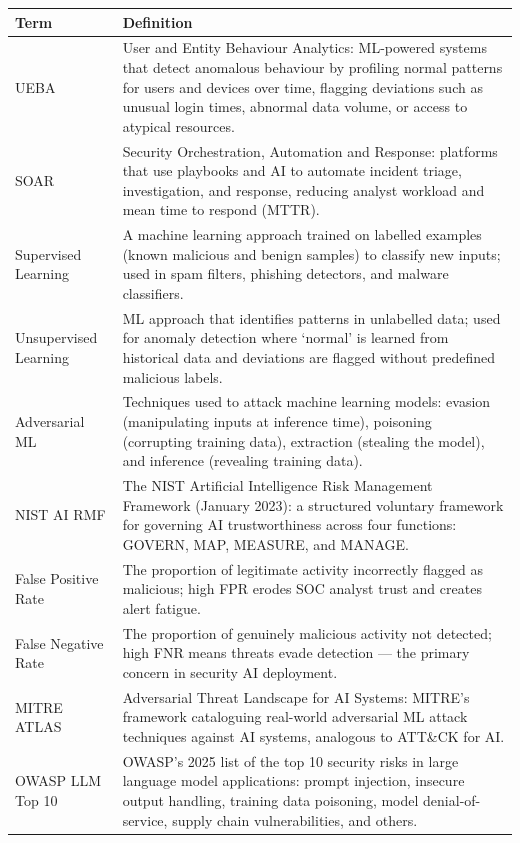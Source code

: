 \documentclass[12pt,a4paper]{article}
\begin{document}
\begin{center}
\renewcommand{\arraystretch}{1.5}
\begin{tabular}{|p{3cm}|p{10.5cm}|}
\hline
\textbf{Term} & \textbf{Definition} \\
\hline
UEBA & User and Entity Behaviour Analytics: ML-powered systems that detect anomalous behaviour by profiling normal patterns for users and devices over time, flagging deviations such as unusual login times, abnormal data volume, or access to atypical resources. \\
\hline
SOAR & Security Orchestration, Automation and Response: platforms that use playbooks and AI to automate incident triage, investigation, and response, reducing analyst workload and mean time to respond (MTTR). \\
\hline
Supervised Learning & A machine learning approach trained on labelled examples (known malicious and benign samples) to classify new inputs; used in spam filters, phishing detectors, and malware classifiers. \\
\hline
Unsupervised Learning & ML approach that identifies patterns in unlabelled data; used for anomaly detection where `normal' is learned from historical data and deviations are flagged without predefined malicious labels. \\
\hline
Adversarial ML & Techniques used to attack machine learning models: evasion (manipulating inputs at inference time), poisoning (corrupting training data), extraction (stealing the model), and inference (revealing training data). \\
\hline
NIST AI RMF & The NIST Artificial Intelligence Risk Management Framework (January 2023): a structured voluntary framework for governing AI trustworthiness across four functions: GOVERN, MAP, MEASURE, and MANAGE. \\
\hline
False Positive Rate & The proportion of legitimate activity incorrectly flagged as malicious; high FPR erodes SOC analyst trust and creates alert fatigue. \\
\hline
False Negative Rate & The proportion of genuinely malicious activity not detected; high FNR means threats evade detection --- the primary concern in security AI deployment. \\
\hline
MITRE ATLAS & Adversarial Threat Landscape for AI Systems: MITRE's framework cataloguing real-world adversarial ML attack techniques against AI systems, analogous to ATT\&CK for AI. \\
\hline
OWASP LLM Top 10 & OWASP's 2025 list of the top 10 security risks in large language model applications: prompt injection, insecure output handling, training data poisoning, model denial-of-service, supply chain vulnerabilities, and others. \\

\end{tabular}
\end{center}
\end{document}
